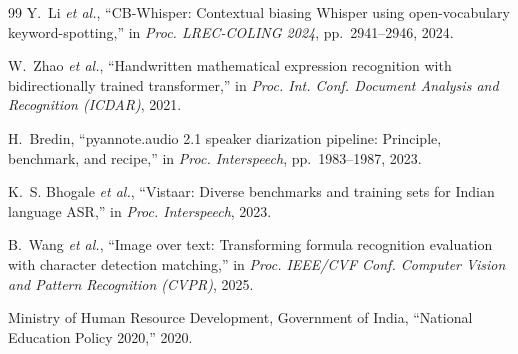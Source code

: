 \documentclass[11pt,a4paper,oneside]{report}
\theoremstyle{definition}
\begin{document}
\begin{thebibliography}{99}
Y.~Li \emph{et al.}, ``CB-Whisper: Contextual biasing Whisper using open-vocabulary keyword-spotting,'' in \emph{Proc. LREC-COLING 2024}, pp.~2941--2946, 2024.

W.~Zhao \emph{et al.}, ``Handwritten mathematical expression recognition with bidirectionally trained transformer,'' in \emph{Proc. Int. Conf. Document Analysis and Recognition (ICDAR)}, 2021.

H.~Bredin, ``pyannote.audio 2.1 speaker diarization pipeline: Principle, benchmark, and recipe,'' in \emph{Proc. Interspeech}, pp.~1983--1987, 2023.

K.~S. Bhogale \emph{et al.}, ``Vistaar: Diverse benchmarks and training sets for Indian language ASR,'' in \emph{Proc. Interspeech}, 2023.

B.~Wang \emph{et al.}, ``Image over text: Transforming formula recognition evaluation with character detection matching,'' in \emph{Proc. IEEE/CVF Conf. Computer Vision and Pattern Recognition (CVPR)}, 2025.

Ministry of Human Resource Development, Government of India, ``National Education Policy 2020,'' 2020.

\end{thebibliography}
\endgroup
\end{document}
